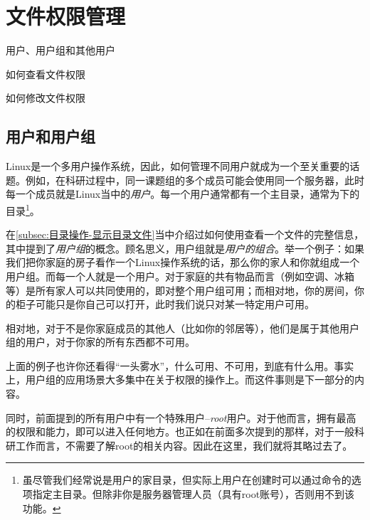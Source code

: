 \section{文件权限管理}\label{sec:文件权限管理}

\begin{Abstract}
    \item 用户、用户组和其他用户
    \item 如何查看文件权限
    \item 如何修改文件权限
\end{Abstract}


\subsection{用户和用户组}\label{subsec:文件权限管理-用户和用户组}

Linux是一个多用户操作系统，因此，如何管理不同用户就成为一个至关重要的话题。例如，在科研过程中，同一课题组的多个成员可能会使用同一个服务器，此时每一个成员就是Linux当中的\emph{用户}。每一个用户通常都有一个主目录，通常为下的目录\footnote{虽尽管我们经常说是用户的家目录，但实际上用户在创建时可以通过命令的选项指定主目录。但除非你是服务器管理人员（具有root账号），否则用不到该功能。}。

在\ref{subsec:目录操作-显示目录文件}当中介绍过如何使用查看一个文件的完整信息，其中提到了\emph{用户组}的概念。顾名思义，用户组就是\emph{用户的组合}。举一个例子：如果我们把你家庭的房子看作一个Linux操作系统的话，那么你的家人和你就组成一个用户组。而每一个人就是一个用户。对于家庭的共有物品而言（例如空调、冰箱等）是所有家人可以共同使用的，即对整个用户组可用；而相对地，你的房间，你的柜子可能只是你自己可以打开，此时我们说只对某一特定用户可用。

相对地，对于不是你家庭成员的其他人（比如你的邻居等），他们是属于其他用户组的用户，对于你家的所有东西都不可用。

\begin{attention}
    上面的例子也许你还看得“一头雾水”，什么可用、不可用，到底有什么用。事实上，用户组的应用场景大多集中在关于权限的操作上。而这件事则是下一部分的内容。

    同时，前面提到的所有用户中有一个特殊用户--\emph{root}用户。对于他而言，拥有最高的权限和能力，即可以进入任何地方。也正如在前面多次提到的那样，对于一般科研工作而言，不需要了解root的相关内容。因此在这里，我们就将其略过去了。
\end{attention}

